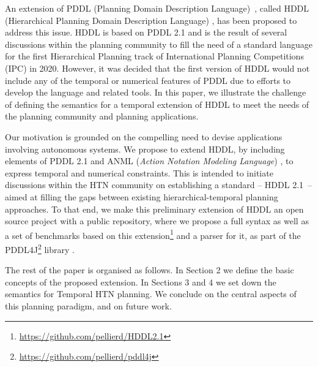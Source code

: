 \documentclass[letterpaper]{article} %
\begin{document}
An extension of PDDL (Planning Domain Description Language)~\citep{mcdermott98}, called HDDL (Hierarchical Planning Domain Description Language) \citep{holler20}, has been proposed to address this issue. HDDL is based on PDDL 2.1 \citep{fox03} and is the result of several discussions within the planning community \citep{Holler19b} to fill the need of a standard language for the first Hierarchical Planning track of International Planning Competitions (IPC) in 2020. However, it was decided that the first version of HDDL would not include any of the temporal or numerical features of PDDL due to efforts to develop the language and related tools. In this paper, we illustrate the challenge of defining the semantics for a temporal extension of HDDL to meet the needs of the planning community and planning applications. %

Our motivation is grounded on the compelling need to devise applications involving autonomous systems. %
We propose to extend HDDL, by including elements of PDDL 2.1 and ANML ({\it Action Notation Modeling Language}) \citep{smith08}, to express temporal and numerical constraints.
This is intended to initiate discussions within the HTN community on establishing a standard -- HDDL 2.1~-- aimed at filling the gaps between existing hierarchical-temporal planning approaches. To that end, we make this preliminary extension of HDDL an open source project with a public repository, where we propose a full syntax as well as a set of benchmarks based on this extension\footnote{\url{https://github.com/pellierd/HDDL2.1}} and a parser for it, as part of the PDDL4J\footnote{\url{https://github.com/pellierd/pddl4j}} library \cite{Pellier18}.

The rest of the paper is organised as follows. In Section 2 we define the basic concepts of the proposed extension. In Sections 3 and 4 we set down the semantics for Temporal HTN planning. We conclude on the central aspects of this planning paradigm, and on future work. %
\end{document}
